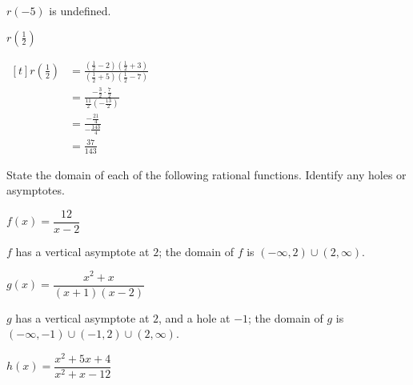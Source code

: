 \begin{exercises}
\begin{problem}
\begin{multicols}{4}
\begin{subproblem}
\begin{shortsolution}
				 $r(-5)$ is undefined.
			 \end{shortsolution}
		 \end{subproblem}
		 \begin{subproblem}
			 $r\left( \frac{1}{2} \right)$
			 \begin{shortsolution}
				 $\begin{aligned}[t]
						 r\left( \frac{1}{2} \right) & = \frac{\left( \frac{1}{2}-2 \right)\left( \frac{1}{2}+3 \right)}{\left( \frac{1}{2}+5 \right)\left( \frac{1}{2}-7 \right)} \\
						                             & =\frac{-\frac{3}{2}\cdot\frac{7}{2}}{\frac{11}{2}\left( -\frac{13}{2} \right)}                                              \\
						                             & =\frac{-\frac{21}{4}}{-\frac{143}{4}}                                                                                       \\
						                             & =\frac{37}{143}
					 \end{aligned}$
			 \end{shortsolution}
		 \end{subproblem}
	 \end{multicols}
	 \end{problem}
	 \begin{problem}
	 State the domain of each of the following rational functions. Identify
	 any holes or asymptotes.
	 \begin{multicols}{3}
		 \begin{subproblem}
			 $f(x)=\dfrac{12}{x-2}$
			 \begin{shortsolution}
				 $f$ has a vertical asymptote at $2$; the domain of $f$ is $(-\infty,2)\cup (2,\infty)$.
			 \end{shortsolution}
		 \end{subproblem}
		 \begin{subproblem}
			 $g(x)=\dfrac{x^2+x}{(x+1)(x-2)}$
			 \begin{shortsolution}
				 $g$ has a vertical asymptote at $2$, and a hole at $-1$; the domain of $g$ is $(-\infty,-1)\cup(-1,2)\cup(2,\infty)$.
			 \end{shortsolution}
		 \end{subproblem}
		 \begin{subproblem}
			 $h(x)=\dfrac{x^2+5x+4}{x^2+x-12}$
			 \begin{shortsolution}

\end{shortsolution}
\end{subproblem}
\end{multicols}
\end{problem}
\end{exercises}
